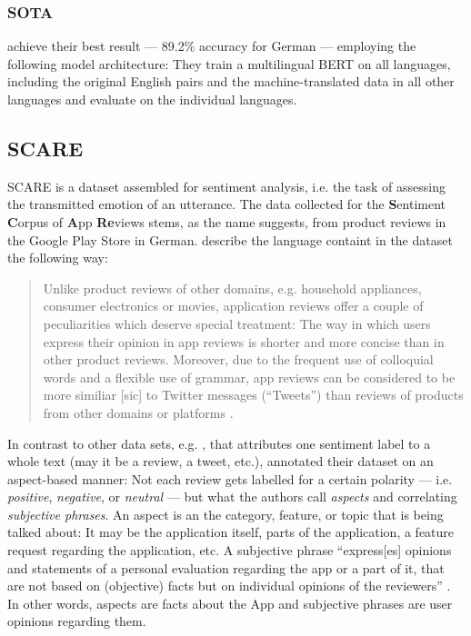 \subsubsection{SOTA}

\cite{yang2019paws} achieve their best result --- 89.2\% accuracy for German --- employing the
following model architecture:
They train a multilingual BERT on all languages, including the original English pairs and the
machine-translated data in all other languages and evaluate on the individual languages.




\subsection{SCARE}


SCARE is a dataset assembled for sentiment analysis, i.e. the task of assessing the
transmitted emotion of an utterance. The data collected for the \textbf{S}entiment
\textbf{C}orpus of \textbf{A}pp \textbf{Re}views stems, as the name suggests, from
product reviews in the Google Play Store in German. \cite{sanger2016scare} describe
the language containt in the dataset the following way:

\begin{quote}
  Unlike product reviews of other domains, e.g. household appliances, consumer electronics or
  movies, application reviews offer a couple of peculiarities which deserve special treatment:
  The way in which users express their opinion in app reviews is shorter and more concise than
  in other product reviews. Moreover, due to the frequent use of colloquial words and a flexible
  use of grammar, app reviews can be considered to be more similiar [sic] to Twitter messages
  (“Tweets”) than reviews of products from other domains or platforms \textelp{}.
\end{quote}

In contrast to other data sets, e.g. \citep{socher2013recursive, go2009twitter},
that attributes one sentiment label to a whole text (may it be a review, a tweet,
etc.), \cite{sanger2016scare} annotated their dataset on an aspect-based manner:
Not each review gets labelled for a certain polarity --- i.e. \emph{positive},
\emph{negative}, or \emph{neutral} --- but what the authors call \emph{aspects} and
correlating \emph{subjective phrases}. An aspect is an the category, feature, or
topic that is being talked about: It may be the application itself, parts of the
application, a feature request regarding the application, etc. A subjective phrase
``express[es] opinions and statements of a personal evaluation regarding the app or
a part of it, that are not based on (objective) facts but on individual opinions of
the reviewers'' \citep[p.~1116]{sanger2016scare}. In other words, aspects are facts
about the App and subjective phrases are user opinions regarding them.


